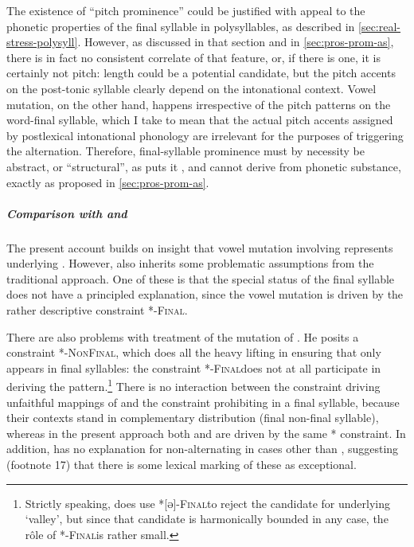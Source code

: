 The existence of \enquote{pitch prominence} could be justified with appeal to the phonetic properties of the final syllable in polysyllables, as described in \cref{sec:real-stress-polysyll}. However, as discussed in that section \citep[see also][]{thomas67:_welsh,rhys84:_inton} and in \cref{sec:pros-prom-as}, there is in fact no consistent correlate of that feature, or, if there is one, it is certainly not pitch: length could be a potential candidate, but the pitch accents on the post\hyp tonic syllable clearly depend on the intonational context. Vowel mutation, on the other hand, happens irrespective of the pitch patterns on the word\hyp final syllable, which I take to mean that the actual pitch accents assigned by postlexical intonational phonology are irrelevant for the purposes of triggering the alternation. Therefore, final\hyp syllable prominence must by necessity be abstract, or \enquote{structural}, as \citet{bosch96:_promin} puts it \citep[\cf also][]{griffen98:_pitch}, and cannot derive from phonetic substance, exactly as proposed in \cref{sec:pros-prom-as}.

\subparagraph{Comparison with \citet{hannahs07:_const_welsh} and \citet{greenbook}}
\label{sec:comp-with-hann}

The present account builds on  insight that vowel mutation involving \ipa{[i]} represents underlying . However, \citet{hannahs07:_const_welsh} also inherits some problematic assumptions from the traditional approach. One of these is that the special status of the final syllable does not have a principled explanation, since the vowel mutation is driven by the rather descriptive constraint *\ipa{[ə]}-\textsc{Final}\sy.

There are also problems with  treatment of the mutation of \ipa{[u]}. He posits a constraint *\ipa{[u]}-\textsc{NonFinal}\sy, which does all the heavy lifting in ensuring that \ipa{[u]} only appears in final syllables: the constraint *\ipa{[ə]}-\textsc{Final}\sy does not at all participate in deriving the \alternation{[u]}{[ə]} pattern.\footnote{Strictly speaking,  does use *\textsc{[ə]}-\textsc{Final}\sy to reject the candidate \ipa{[ˈkəm]} for underlying  `valley', but since that candidate is harmonically bounded in any case, the rôle of *\ipa{[ə]}-\textsc{Final}\sy is rather small.} There is no interaction between the constraint driving unfaithful mappings of \ipa{[u]} and the constraint prohibiting \ipa{[ə]} in a final syllable, because their contexts stand in complementary distribution (final \vs non\hyp final syllable), whereas in the present approach both \alternation{[u]}{[ə]} and \alternation{[i]}{[ə]} are driven by the same *\ipa{[ə́]} constraint. In addition, \citet{hannahs07:_const_welsh} has no explanation for non\hyp alternating \ipa{[u]} in cases other than \ipa{[ˈkumul]}, suggesting (footnote 17) that there is some lexical marking of these as exceptional.

